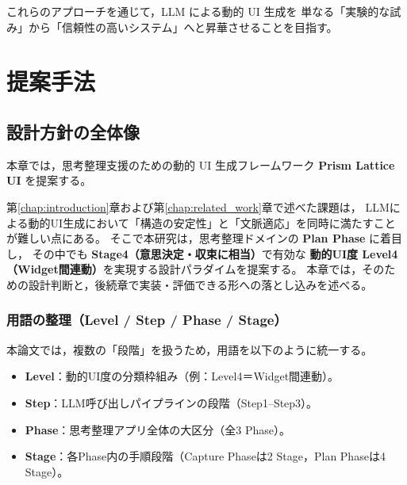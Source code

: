\documentclass[senior,final,11pt,dvipdfmx]{iputit-thesis}
\begin{document}
これらのアプローチを通じて，LLM による動的 UI 生成を
単なる「実験的な試み」から「信頼性の高いシステム」へと昇華させることを目指す。



\chapter{提案手法}
\label{chap:system_design}

\section{設計方針の全体像}

本章では，思考整理支援のための動的 UI 生成フレームワーク \textbf{Prism Lattice UI} を提案する。

第\ref{chap:introduction}章および第\ref{chap:related_work}章で述べた課題は，
LLMによる動的UI生成において「構造の安定性」と「文脈適応」を同時に満たすことが難しい点にある。
そこで本研究は，思考整理ドメインの \textbf{Plan Phase} に着目し，
その中でも \textbf{Stage4（意思決定・収束に相当）}で有効な
\textbf{動的UI度 Level4（Widget間連動）}を実現する設計パラダイムを提案する。
本章では，そのための設計判断と，後続章で実装・評価できる形への落とし込みを述べる。


\subsection{用語の整理（Level / Step /  Phase / Stage）}
本論文では，複数の「段階」を扱うため，用語を以下のように統一する。

\begin{itemize}
  \item \textbf{Level}：動的UI度の分類枠組み（例：Level4＝Widget間連動）。
  \item \textbf{Step}：LLM呼び出しパイプラインの段階（Step1--Step3）。
  \item \textbf{Phase}：思考整理アプリ全体の大区分（全3 Phase）。
  \item \textbf{Stage}：各Phase内の手順段階（Capture Phaseは2 Stage，Plan Phaseは4 Stage）。
\end{itemize}
\end{document}
